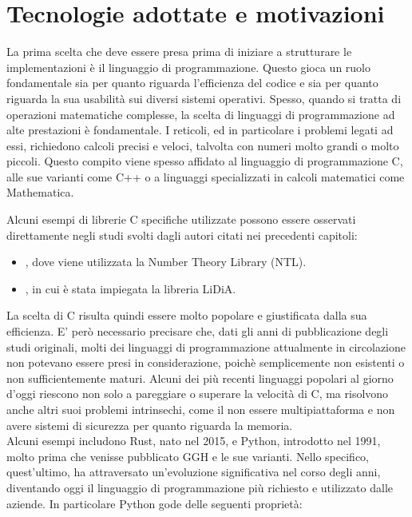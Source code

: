 \section{Tecnologie adottate e motivazioni}
\label{sec:motivations}
La prima scelta che deve essere presa prima di iniziare a strutturare
le implementazioni è il linguaggio di programmazione.
Questo gioca un ruolo fondamentale sia per quanto riguarda l'efficienza del codice e sia 
per quanto riguarda la sua usabilità sui diversi sistemi operativi. Spesso, quando si tratta 
di operazioni matematiche complesse, la scelta di linguaggi di programmazione ad alte 
prestazioni è fondamentale. I reticoli, ed in particolare i problemi legati ad essi, richiedono
calcoli precisi e veloci, talvolta con numeri molto grandi o molto piccoli.
Questo compito viene spesso affidato al linguaggio di programmazione C, alle sue varianti
come C++ o a linguaggi specializzati in calcoli matematici come Mathematica. 

Alcuni esempi di librerie C specifiche utilizzate possono essere osservati direttamente 
negli studi svolti dagli autori citati nei precedenti capitoli:
\begin{itemize}
    \item \cite{HNF01,HNF04,Nguyen400}, dove viene utilizzata la Number Theory Library (NTL).
    \item \cite{GGH97, Nguyen99}, in cui è stata impiegata la libreria LiDiA.
\end{itemize}

La scelta di C risulta quindi essere molto popolare e giustificata dalla sua efficienza. 
E' però necessario precisare che, dati gli anni di pubblicazione degli studi originali, molti
dei linguaggi di programmazione attualmente in circolazione non potevano essere presi 
in considerazione, poichè semplicemente non esistenti o non sufficientemente maturi. 
Alcuni dei più recenti linguaggi
popolari al giorno d'oggi riescono non solo a pareggiare o superare la velocità di C, ma
risolvono anche altri suoi problemi intrinsechi, come il non essere multipiattaforma
e non avere sistemi di sicurezza per quanto riguarda la memoria. \\
Alcuni esempi includono Rust, nato nel 2015, e Python, introdotto nel 1991, molto prima 
che venisse pubblicato GGH e le sue varianti. Nello specifico, quest'ultimo, ha attraversato 
un'evoluzione significativa nel corso degli anni, diventando oggi il linguaggio 
di programmazione più richiesto e utilizzato dalle aziende.
In particolare Python gode delle seguenti proprietà:

